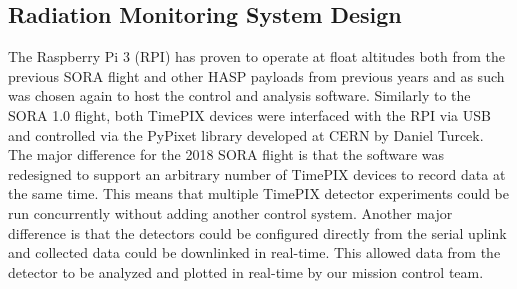 \subsection{Radiation Monitoring System Design}
\label{sec:Radiation Design}
The Raspberry Pi 3 (RPI) has proven to operate at float altitudes both from the previous SORA flight and other HASP payloads from previous years and as such was chosen again to host the control and analysis software. Similarly to the SORA 1.0 flight, both TimePIX devices were interfaced with the RPI via USB and controlled via the PyPixet library developed at CERN by Daniel Turcek. The major difference for the 2018 SORA flight is that the software was redesigned to support an arbitrary number of TimePIX devices to record data at the same time. This means that multiple TimePIX detector experiments could be run concurrently without adding another control system. Another major difference is that the detectors could be configured directly from the serial uplink and collected data could be downlinked in real-time. This allowed data from the detector to be analyzed and plotted in real-time by our mission control team.

